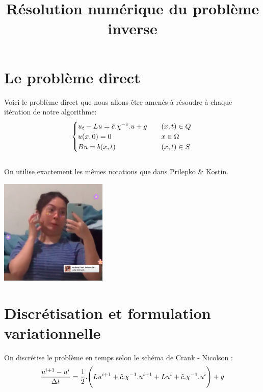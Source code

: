 \documentclass[a4paper]{article}
\title{Résolution numérique du problème inverse}
\begin{document}
	
	\maketitle
	
	\section{Le problème direct}
	
	Voici le problème direct que nous allons être amenés à résoudre à chaque itération de notre algorithme:
	\begin{equation}
		\begin{cases}
			u_{t} - Lu = \tilde{c}.\chi^{-1}.u + g &\quad (x,t)\in Q \\
			u(x,0) = 0 &\quad x\in \Omega \\
			Bu = b(x,t) &\quad (x,t) \in S\\
		\end{cases}\\
	\end{equation}\\
	
	On utilise exactement les mêmes notations que dans Prilepko \& Kostin.
	\begin{center}
		\includegraphics[height=5cm]{./resources/figures/test.png}
	\end{center}
	
	\section{Discrétisation et formulation variationnelle}
	
	On discrétise le problème en temps selon le schéma de Crank - Nicolson :
	\begin{equation}
		\frac{u^{i+1}-u^{i}}{\Delta t} = \frac{1}{2}.\Bigg(Lu^{i+1} + \tilde{c}.\chi^{-1}.u^{i+1} + Lu^{i} + \tilde{c}.\chi^{-1}.u^{i} \Bigg) + g\\
	\end{equation}\\
	
\end{document}
